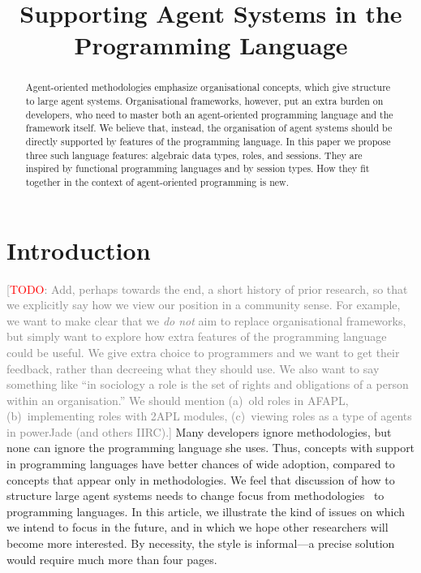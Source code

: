 \documentclass[conference,compsoc]{IEEEtran} %
\title{Supporting Agent Systems in the Programming Language}
\author{
  \IEEEauthorblockN{Claudia Grigore and Rem Collier} 
  \IEEEauthorblockA{
    School of Computer Science and Informatics\\
    University College Dublin\\
    Belfield Campus, Dublin~4, Ireland\\
    Email: claudia.grigore@ucdconnect.ie, rem.collier@ucd.ie}}
\newcommand{\todo}[1]{{\small \textcolor{gray}{[\textcolor{red}{TODO}: #1]}}}
\begin{document}
\maketitle
\begin{abstract} %

Agent-oriented methodologies emphasize organisational concepts, which give
structure to large agent systems. Organisational frameworks, however, put
an extra burden on developers, who need to master both an agent-oriented
programming language and the framework itself. We believe that, instead,
the organisation of agent systems should be directly supported by features
of the programming language. In this paper we propose three such language
features: algebraic data types, roles, and sessions.  They are inspired by
functional programming languages and by session types.  How they fit
together in the context of agent-oriented programming is new.

\end{abstract} %
\section{Introduction} %

\todo{Add, perhaps towards the end, a short history of prior research, so
that we explicitly say how we view our position in a community sense. For
example, we want to make clear that we \emph{do not} aim to replace
organisational frameworks, but simply want to explore how extra features of
the programming language could be useful. We give extra choice to
programmers and we want to get their feedback, rather than decreeing what
they should use.  We also want to say something like ``in sociology a role
is the set of rights and obligations of a person within an organisation.''
We should mention (a)~old roles in AFAPL, (b)~implementing roles with 2APL
modules, (c)~viewing roles as a type of agents in powerJade (and others
IIRC).} Many developers ignore methodologies, but none can ignore the
programming language she uses. Thus, concepts with support in programming
languages have better chances of wide adoption, compared to concepts that
appear only in methodologies. We feel that discussion of how to structure
large agent systems needs to change focus from
methodologies~\cite{dblp:conf/aose/ferbergm03} to programming languages.
In this article, we illustrate the kind of issues on which we intend to
focus in the future, and in which we hope other researchers will become
more interested. By necessity, the style is informal---a precise solution
would require much more than four pages.
\end{document}
